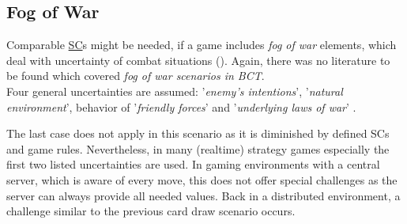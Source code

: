 \subsection{Fog of War}
\label{sec:FogOfWar}
\noindent Comparable \hyperref[sec:SmartContract]{SC}s might be needed, if a game includes
\textit{fog of war} elements, which deal with uncertainty of combat situations (\citet{Setear.1989}). \label{lbl:FogOfWar}
Again, there was no literature to be found which covered \textit{fog of war scenarios in \gls{BCT}}. \\
Four general uncertainties are assumed: '\textit{enemy's intentions}', '\textit{natural environment}',
behavior of '\textit{friendly forces}' and '\textit{underlying laws of war}' \cite[3-4]{Setear.1989}.
\begin{figure}
\end{figure}
The last case does not apply in this scenario as it is diminished by defined \gls{SC}s and game rules.
Nevertheless, in many (realtime) strategy games especially the first two listed uncertainties are used.
In gaming environments with a central server, which is aware of every move, this does not offer special challenges as the server can always provide all needed values.
Back in a distributed environment, a challenge similar to the previous card draw scenario occurs.
\begin{figure}
\end{figure}

